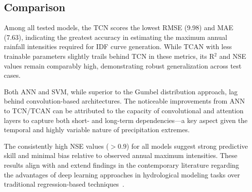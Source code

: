 \subsection{Comparison}
Among all tested models, the TCN scores the lowest RMSE (9.98) and MAE (7.63), indicating the greatest accuracy in estimating the maximum annual rainfall intensities required for IDF curve generation. While TCAN with less trainable parameters slightly trails behind TCN in these metrics, its R$^{2}$ and NSE values remain comparably high, demonstrating robust generalization across test cases.

\vspace{1em}

Both ANN and SVM, while superior to the Gumbel distribution approach, lag behind convolution-based architectures. The noticeable improvements from ANN to TCN/TCAN can be attributed to the capacity of convolutional and attention layers to capture both short- and long-term dependencies—a key aspect given the temporal and highly variable nature of precipitation extremes.

\vspace{1em}

The consistently high NSE values ($> 0.9$) for all models suggest strong predictive skill and minimal bias relative to observed annual maximum intensities. These results align with and extend findings in the contemporary literature regarding the advantages of deep learning approaches in hydrological modeling tasks over traditional regression-based techniques~\cite{14}.
